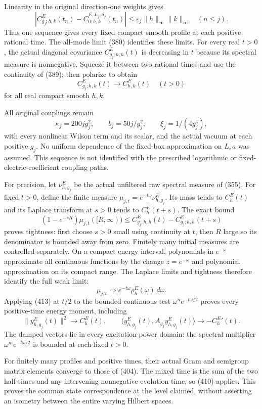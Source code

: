 \documentclass[
  11pt,
]{article}
\begin{document}
Linearity in the original direction-one weights gives \[
 |C^E_{g_j;h,k}(t_n)-C^{E,L_j,a_j}_{0;h,k}(t_n)|
 \le\varepsilon_j\|h\|_\infty\|k\|_\infty
 \quad(n\le j).
 \tag{409}
\] Thus one sequence gives every fixed compact smooth profile at each
positive rational time. The all-mode limit (380) identifies these
limits. For every real \(t>0\), the actual diagonal covariance
\(C^E_{g_j;h,h}(t)\) is decreasing in \(t\) because its spectral measure
is nonnegative. Squeeze it between two rational times and use the
continuity of (389); then polarize to obtain \[
 C^E_{g_j;h,k}(t)\longrightarrow C^E_{h,k}(t)
 \quad(t>0)
 \tag{410}
\] for all real compact smooth \(h,k\).

All original couplings remain \[
 \kappa_j=200jg_j^2,\qquad
 b_j=50j/g_j^2,\qquad
 \xi_j=1/(4g_j^4),
 \tag{411}
\] with every nonlinear Wilson term and its scalar, and the actual
vacuum at each positive \(g_j\). No uniform dependence of the fixed-box
approximation on \(L,a\) was assumed. This sequence is not identified
with the prescribed logarithmic or fixed-electric-coefficient coupling
paths.

For precision, let \(\nu^E_{h,g_j}\) be the actual unfiltered raw
spectral measure of (355). For fixed \(t>0\), define the finite measure
\(\mu_{j,t}=e^{-t\omega}\nu^E_{h,g_j}\). Its mass tends to \(C^E_h(t)\)
and its Laplace transform at \(s>0\) tends to \(C^E_h(t+s)\). The exact
bound \[
 (1-e^{-sR})\mu_{j,t}([R,\infty))
 \le C^E_{g_j;h,h}(t)-C^E_{g_j;h,h}(t+s)
 \tag{412}
\] proves tightness: first choose \(s>0\) small using continuity at
\(t\), then \(R\) large so its denominator is bounded away from zero.
Finitely many initial measures are controlled separately. On a compact
energy interval, polynomials in \(e^{-\omega}\) approximate all
continuous functions by the change \(z=e^{-\omega}\) and polynomial
approximation on its compact range. The Laplace limits and tightness
therefore identify the full weak limit: \[
 \boxed{\mu_{j,t}\Longrightarrow
           e^{-t\omega}\rho^E_h(\omega)\,d\omega.}
 \tag{413}
\] Applying (413) at \(t/2\) to the bounded continuous test
\(\omega^n e^{-t\omega/2}\) proves every positive-time energy moment,
including \[
 \|y^E_{h,g_j}(t)\|^2\to C^E_h(t),\qquad
 \langle y^E_{h,g_j}(t),A_{g_j}y^E_{h,g_j}(t)\rangle
                   \to-{C^E_h}'(t).
 \tag{414}
\] The damped vectors lie in every excitation-power domain: the spectral
multiplier \(\omega^m e^{-t\omega/2}\) is bounded at each fixed \(t>0\).

For finitely many profiles and positive times, their actual Gram and
semigroup matrix elements converge to those of (404). The mixed time is
the sum of the two half-times and any intervening nonnegative evolution
time, so (410) applies. This proves the common state correspondence at
the level claimed, without asserting an isometry between the entire
varying Hilbert spaces.
\end{document}
